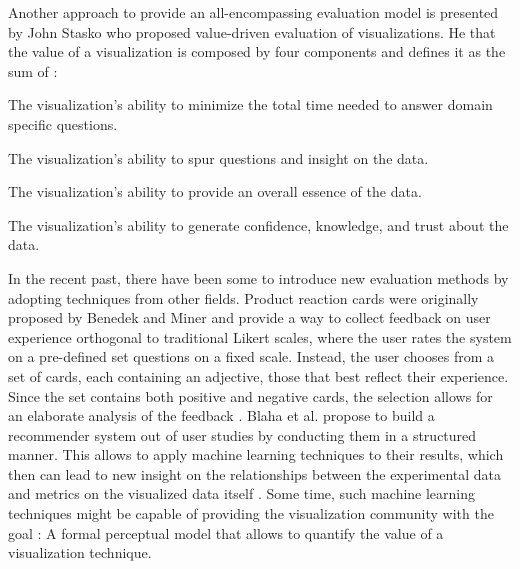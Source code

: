 Another approach to provide an all-encompassing evaluation model is presented by John Stasko who proposed value-driven evaluation of visualizations.
He  that the value of a visualization is composed by four components and defines it as the sum of \cite{Stasko:2014:ValueDrivenEvaluation}:
\begin{my_list_item}
	\item The visualization's ability to minimize the total time needed to answer domain specific questions.
	\item The visualization's ability to spur questions and insight on the data.
	\item The visualization's ability to provide an overall essence of the data.
	\item The visualization's ability to generate confidence, knowledge, and trust about the data.
\end{my_list_item}

In the recent past, there have been some  to introduce new evaluation methods by adopting techniques from other fields.
Product reaction cards were originally proposed by Benedek and Miner \cite{Benedek:2003:Desirability} and provide a way to collect feedback on user experience orthogonal to traditional Likert scales, where the user rates the system on a pre-defined set questions on a fixed scale.
Instead, the user chooses from a set of cards, each containing an adjective, those that best reflect their experience.
Since the set contains both positive and negative cards, the selection allows for an elaborate analysis of the feedback \cite{Barnum:2010:MoreThanAFeeling, Mercun:2014:ReactionCards}.
Blaha et al. propose to build a recommender system out of user studies by conducting them in a structured manner.
This allows to apply machine learning techniques to their results, which then can lead to new insight on the relationships between the experimental data and metrics on the visualized data itself \cite{Blaha:2014:RecommenderSystem}.
Some time, such machine learning techniques might be capable of providing the visualization community with the goal :
A formal perceptual model that allows to quantify the value of a visualization technique.

